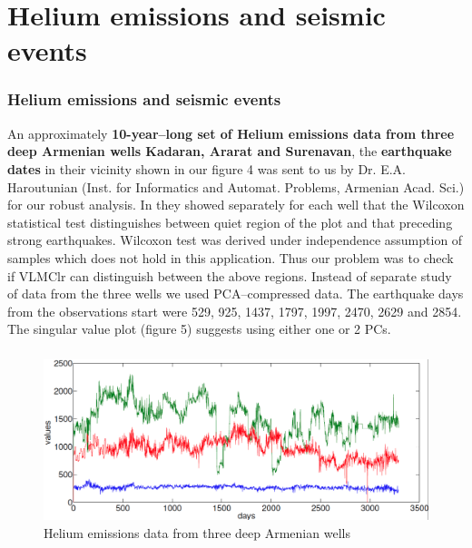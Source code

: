 \documentclass{beamer}
\begin{document}
\section{Helium emissions and seismic events}
\begin{frame}
\frametitle{Helium emissions and seismic events}
An approximately {\bf 10-year--long set of Helium emissions data from three deep Armenian wells Kadaran, Ararat and Surenavan}, 
the {\bf earthquake dates} in their vicinity shown in our figure 4 was sent to us by Dr. E.A. Haroutunian (Inst. for 
Informatics and Automat. Problems, Armenian Acad. Sci.) 
for our robust analysis. In 
 \cite{IEEEhowto:Haroutunian} they showed separately for each well that the Wilcoxon statistical test distinguishes between quiet 
region of the plot and that preceding strong earthquakes. Wilcoxon test was derived under independence assumption of samples which does not 
hold in this application. Thus our problem was to check if VLMClr can distinguish between the above regions. Instead of separate study of 
data from the three wells we used PCA--compressed data.
The earthquake days from the observations start were 529, 925, 1437, 1797, 1997, 2470, 2629 and 2854.
The singular value plot (figure 5) suggests using either one or 2 PCs.




\end{frame}
\begin{frame}
\frametitle{}
\begin{figure}[h!]
  \centering
\includegraphics[scale=0.29]{DeepWell.png}
  \caption{Helium emissions data from three deep Armenian wells}
\label{fig:DeepWell}
\end{figure}


\end{frame}
\end{document}
